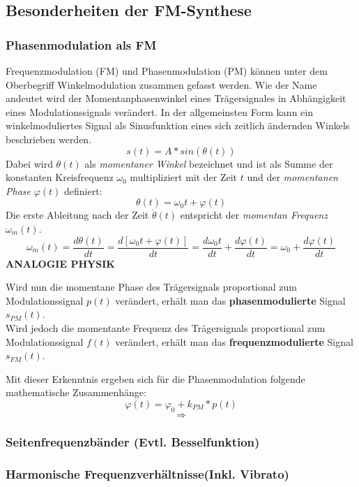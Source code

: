 \subsection{Besonderheiten der FM-Synthese}

\subsubsection{Phasenmodulation als FM}
Frequenzmodulation (FM) und Phasenmodulation (PM) können unter dem Oberbegriff Winkelmodulation zusammen gefasst werden. Wie der Name andeutet wird der Momentanphasenwinkel eines Trägersignales in Abhängigkeit eines Modulationssignals verändert. In der allgemeinsten Form kann ein winkelmoduliertes Signal als Sinusfunktion eines sich zeitlich ändernden Winkels beschrieben werden.
\begin{equation}
s(t)=A*sin(\theta(t))
\end{equation}
Dabei wird $\theta(t)$ als \textit{momentaner Winkel} bezeichnet und ist als Summe der konstanten Kreisfrequenz $\omega_0$ multipliziert mit der Zeit $t$ und der \textit{momentanen Phase} $\varphi(t)$ definiert:
\begin{equation}
\theta(t)=\omega_0t + \varphi(t)
\end{equation}
Die erste Ableitung nach der Zeit $\dot{\theta}(t)$ entspricht der \textit{momentan Frequenz} $\omega_m(t)$.
\begin{equation}
\omega_m(t)=\frac{d\theta(t)}{dt}=\frac{d[\omega_0t+\varphi(t)]}{dt}=\frac{d\omega_0t}{dt}+\frac{d\varphi(t)}{dt}=\omega_0+\frac{d\varphi(t)}{dt}
\end{equation}
\textbf{ANALOGIE PHYSIK}

Wird nun die momentane Phase des Trägersignals proportional zum Modulationssignal $p(t)$ verändert, erhält man das \textbf{phasenmodulierte} Signal $s_{PM}(t)$.\\
Wird jedoch die momentante Frequenz des Trägersignals proportional zum Modulationssignal $f(t)$ verändert, erhält man das \textbf{frequenzmodulierte} Signal $s_{FM}(t)$.

Mit dieser Erkenntnis ergeben sich für die Phasenmodulation folgende mathematische Zusammenhänge:
\[
\varphi(t)=\varphi_0+k_{PM}*p(t)
\]
\[
\Rightarrow
\]

\subsubsection{Seitenfrequenzbänder (Evtl. Besselfunktion)}
\subsubsection{Harmonische Frequenzverhältnisse(Inkl. Vibrato)}